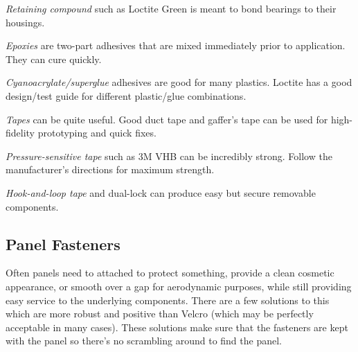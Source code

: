 	\begin{asparaenum}[a)]
		\item \textit{Retaining compound} such as Loctite Green is meant to bond bearings to their housings.
		\item \textit{Epoxies} are two-part adhesives that are mixed immediately prior to application. They can cure quickly.
		\item \textit{Cyanoacrylate/superglue} adhesives are good for many plastics. Loctite has a good design/test guide for different plastic/glue combinations.
		\item \textit{Tapes} can be quite useful. Good duct tape and gaffer's tape can be used for high-fidelity prototyping and quick fixes.
		\item \textit{Pressure-sensitive tape} such as 3M VHB can be incredibly strong. Follow the manufacturer's directions for maximum strength.
		\item \textit{Hook-and-loop tape} and dual-lock can produce easy but secure removable components.
	\end{asparaenum}
	
	
	\subsection{Panel Fasteners}
	Often panels need to attached to protect something, provide a clean cosmetic appearance, or smooth over a gap for aerodynamic purposes, while still providing easy service to the underlying components. There are a few solutions to this which are more robust and positive than Velcro (which may be perfectly acceptable in many cases). These solutions make sure that the fasteners are kept with the panel so there's no scrambling around to find the panel.
	
